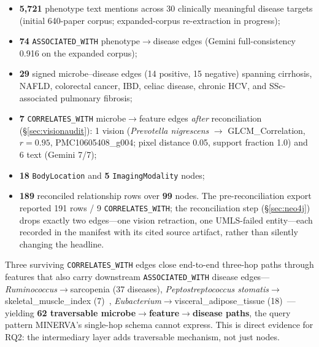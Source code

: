 \documentclass[10pt,twocolumn,letterpaper]{article}
\begin{document}
\begin{itemize}
\item \textbf{5{,}721} phenotype text mentions across 30 clinically
meaningful disease targets (initial 640-paper corpus; expanded-corpus
re-extraction in progress);
\item \textbf{74} \texttt{ASSOCIATED\_WITH} phenotype$\rightarrow$disease
edges (Gemini full-consistency 0.916 on the expanded corpus);
\item \textbf{29} signed microbe--disease edges (14 positive, 15 negative)
spanning cirrhosis, NAFLD, colorectal cancer, IBD, celiac disease, chronic
HCV, and SSc-associated pulmonary fibrosis;
\item \textbf{7} \texttt{CORRELATES\_WITH} microbe$\rightarrow$feature edges
\emph{after} reconciliation (\S\ref{sec:visionaudit}): 1 vision
(\textit{Prevotella nigrescens} $\rightarrow$ GLCM\_Correlation, $r=0.95$,
PMC10605408\_g004; pixel distance 0.05, support fraction 1.0) and 6 text
(Gemini 7/7);
\item \textbf{18} \texttt{BodyLocation} and \textbf{5}
\texttt{ImagingModality} nodes;
\item \textbf{189} reconciled relationship rows over \textbf{99} nodes. The
pre-reconciliation export reported 191 rows / 9 \texttt{CORRELATES\_WITH}; the
reconciliation step (\S\ref{sec:neo4j}) drops exactly two edges---one vision
retraction, one UMLS-failed entity---each recorded in the manifest with its
cited source artifact, rather than silently changing the headline.
\end{itemize}

Three surviving \texttt{CORRELATES\_WITH} edges close end-to-end three-hop
paths through features that also carry downstream \texttt{ASSOCIATED\_WITH}
disease edges---\textit{Ruminococcus}$\rightarrow$sarcopenia (37 diseases),
\textit{Peptostreptococcus stomatis}$\rightarrow$skeletal\_muscle\_index
(7)~\cite{ticinesi2019gutmuscle},
\textit{Eubacterium}$\rightarrow$visceral\_adipose\_tissue
(18)~\cite{cani2008endotoxemia}---yielding \textbf{62 traversable
microbe$\rightarrow$feature$\rightarrow$disease paths}, the query pattern
MINERVA's single-hop schema cannot express. This is direct evidence for
RQ2: the intermediary layer adds traversable mechanism, not just nodes.
\end{document}
